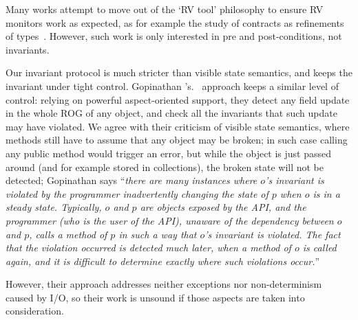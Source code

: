 Many works attempt to move out of the `RV tool' philosophy to ensure RV monitors work as expected, as for example
the study of contracts as refinements of types~\cite{findler2001contract}.
However, such work is only interested in pre and post-conditions, not invariants.

Our invariant protocol is much stricter than
visible state semantics, and keeps the invariant under tight control.
Gopinathan \etal's.~\cite{Gopinathan:2008:RMO:1483018.1483028} approach keeps
a similar level of control:
relying on powerful aspect-oriented support, they detect any field update in the whole ROG of any object, and check all the invariants that such update may have violated.
We agree with their criticism of visible state semantics, where  methods still have to assume that any object may be broken; in such case calling any public method would trigger an error, but while the object is just passed around (and for example stored in collections), the broken state will not be detected; Gopinathan \etal says ``\emph{there are many instances where $o$'s invariant is violated by the programmer inadvertently changing the state of $p$ when $o$ is in a steady state. Typically, $o$ and $p$ are objects exposed by the API, and the programmer (who is the user of the API), unaware of the dependency between $o$ and $p$, calls a method of $p$ in such a way that $o$'s invariant is violated. The fact that the violation occurred is detected much later, when a method of $o$ is called again, and it is difficult to determine exactly where such violations occur.}''

However, their approach addresses neither exceptions nor non-determinism caused by I/O, so their work is unsound if those aspects are taken into consideration.

